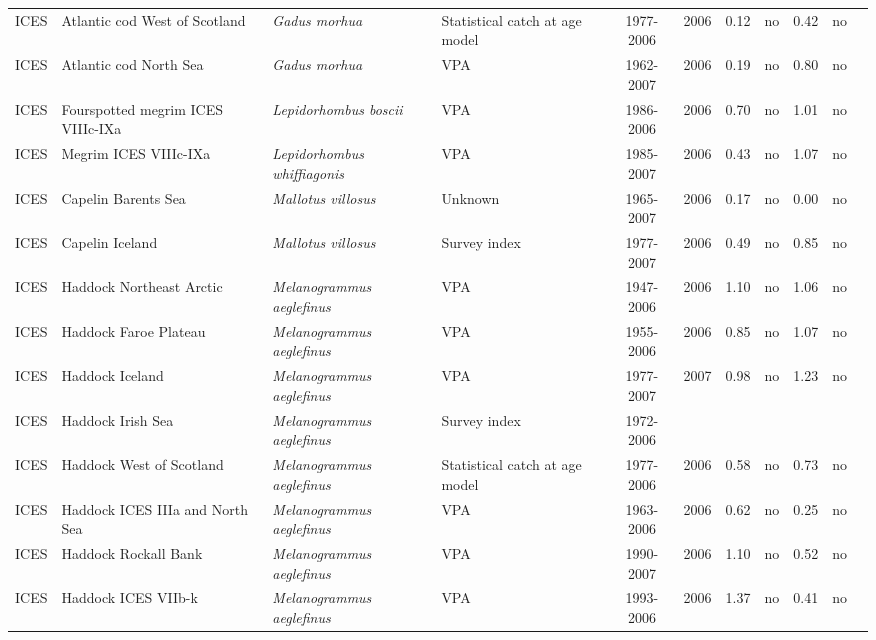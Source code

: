 \begin{longtable}{p{1.8cm}p{3.5cm}p{3.5cm}p{3cm}cccp{0.9cm}cp{0.9cm}c}
  ICES & Atlantic cod West of Scotland & \textit{Gadus morhua} & Statistical catch at age model & 1977-2006 & 2006 & 0.12 & no & 0.42 & no & \cite{ICES-WGNSDS-2007.pdf} \\ 
  ICES & Atlantic cod North Sea & \textit{Gadus morhua} & VPA & 1962-2007 & 2006 & 0.19 & no & 0.80 & no & \cite{ICES-WGNSSK-2007.pdf} \\ 
  ICES & Fourspotted megrim ICES VIIIc-IXa & \textit{Lepidorhombus boscii} & VPA & 1986-2006 & 2006 & 0.70 & no & 1.01 & no & \cite{ICES-WGHMM-2007.pdf} \\ 
  ICES & Megrim ICES VIIIc-IXa & \textit{Lepidorhombus whiffiagonis} & VPA & 1985-2007 & 2006 & 0.43 & no & 1.07 & no & \cite{ICES-WGHMM-2007.pdf} \\ 
  ICES & Capelin Barents Sea & \textit{Mallotus villosus} & Unknown & 1965-2007 & 2006 & 0.17 & no & 0.00 & no & \cite{ICES-AFWG-2007.pdf} \\ 
  ICES & Capelin Iceland & \textit{Mallotus villosus} & Survey index & 1977-2007 & 2006 & 0.49 & no & 0.85 & no & \cite{ICES-NWWG-2007.pdf} \\ 
  ICES & Haddock Northeast Arctic & \textit{Melanogrammus aeglefinus} & VPA & 1947-2006 & 2006 & 1.10 & no & 1.06 & no & \cite{ICES-AFWG-2007.pdf} \\ 
  ICES & Haddock Faroe Plateau & \textit{Melanogrammus aeglefinus} & VPA & 1955-2006 & 2006 & 0.85 & no & 1.07 & no & \cite{ICES-NWWG-2007.pdf} \\ 
  ICES & Haddock Iceland & \textit{Melanogrammus aeglefinus} & VPA & 1977-2007 & 2007 & 0.98 & no & 1.23 & no & \cite{ICES-NWWG-2007.pdf} \\ 
  ICES & Haddock Irish Sea & \textit{Melanogrammus aeglefinus} & Survey index & 1972-2006 &  &  &  &  &  & \cite{ICES-WGNSDS-2007.pdf} \\ 
  ICES & Haddock West of Scotland & \textit{Melanogrammus aeglefinus} & Statistical catch at age model & 1977-2006 & 2006 & 0.58 & no & 0.73 & no & \cite{ICES-WGNSDS-2007.pdf} \\ 
  ICES & Haddock ICES IIIa and North Sea & \textit{Melanogrammus aeglefinus} & VPA & 1963-2006 & 2006 & 0.62 & no & 0.25 & no & \cite{ICES-WGNSSK-2007.pdf} \\ 
  ICES & Haddock Rockall Bank & \textit{Melanogrammus aeglefinus} & VPA & 1990-2007 & 2006 & 1.10 & no & 0.52 & no & \cite{ICES-WGNSDS-2007.pdf} \\ 
  ICES & Haddock ICES VIIb-k & \textit{Melanogrammus aeglefinus} & VPA & 1993-2006 & 2006 & 1.37 & no & 0.41 & no & \cite{ICES-WGSSDS-2007.pdf} \\ 

\end{longtable}
